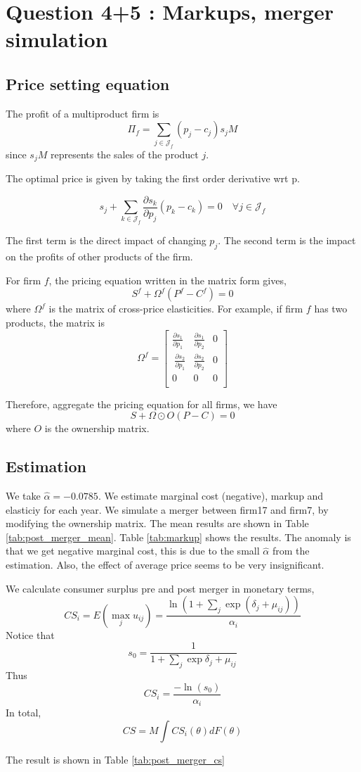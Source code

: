 \documentclass[12pt]{article}
\begin{document}
\section{Question 4+5 : Markups, merger simulation}
\subsection{Price setting equation}
The profit of a multiproduct firm is $$ \Pi_f = \sum_{j\in \mathcal{J}_f} (p_j
    -c_j )s_jM$$ since $s_jM$ represents the sales of the product $j$.

The optimal price is given by taking the first order derivative wrt p.

$$ s_j+\sum_{k\in \mathcal{J}_f} \frac{\partial s_k}{\partial p_j} (p_k-c_k) = 0 \quad \forall j\in \mathcal{J}_f$$

The first term is the direct impact of changing $p_j$. The second term is the
impact on the profits of other products of the firm.

For firm $f$, the pricing equation written in the matrix form gives, $$ S^f +
    \Omega^f(P^f-C^f) = 0$$ where $\Omega^f$ is the matrix of cross-price
elasticities. For example, if firm $f$ has two products, the matrix is $$
    \Omega^f =\begin{bmatrix}
        \frac{\partial s_1}{\partial p_1} & \frac{\partial s_1}{\partial p_2} & 0 \\\ \frac{\partial s_2}{\partial p_1} &\frac{\partial s_2}{\partial p_2} & 0 \\0 & 0 &0\\
    \end{bmatrix}$$

Therefore, aggregate the pricing equation for all firms, we have $$ S + \Omega
    \odot O (P-C) = 0 $$ where $O$ is the ownership matrix.
\subsection{Estimation}
We take $\hat{\alpha}=-0.0785$. We estimate marginal cost (negative), markup
and elasticiy for each year. We simulate a merger between firm17 and firm7, by
modifying the ownership matrix. The mean results are shown in Table
\ref{tab:post_merger_mean}. Table \ref{tab:markup} shows the results.
 The anomaly is that we get
negative marginal cost, this is due to the small $\hat{\alpha}$ from the
estimation. Also, the effect of average price seems to be very insignificant.

We calculate consumer surplus pre and post merger in monetary terms, $$CS_i =
    E(\max_j u_{ij})= \frac{\ln(1+\sum_j \exp(\delta_j+\mu_{ij}))}{\alpha_i}$$
Notice that $$s_0=\frac{1}{1+\sum_j \exp\delta_j+\mu_{ij}}$$ Thus
$$CS_i=\frac{-\ln(s_0)}{\alpha_i}$$ In total, $$ CS = M\int
    CS_i(\theta)dF(\theta)$$

The result is shown in Table \ref{tab:post_merger_cs}

\end{document}
